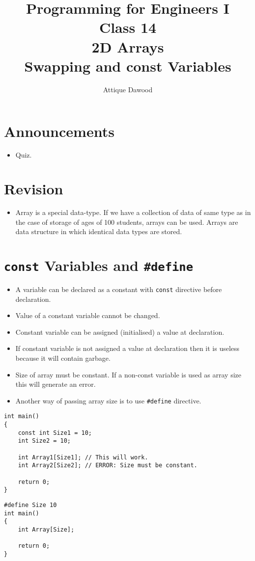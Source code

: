 \documentclass[12pt,a4paper]{article}
\title{\vspace{-2cm}Programming for Engineers I\\Class 14\\2D Arrays\\Swapping and const Variables}
\author{Attique Dawood}
\begin{document}
\maketitle
\section{Announcements}
\begin{itemize}
\item Quiz.
\end{itemize}
\section{Revision}
\begin{itemize}
\item Array is a special data-type. If we have a collection of data of same type as in the case of storage of ages of 100 students, arrays can be used. Arrays are data structure in which identical data types are stored.
\end{itemize}
\section{\texttt{const} Variables and \texttt{\#define}}
\begin{itemize}
\item A variable can be declared as a constant with \verb|const| directive before declaration.
\item Value of a constant variable cannot be changed.
\item Constant variable can be assigned (initialised) a value at declaration.
\item If constant variable is not assigned a value at declaration then it is useless because it will contain garbage.
\item Size of array must be constant. If a non-const variable is used as array size this will generate an error.
\item Another way of passing array size is to use \verb|#define| directive.
\end{itemize}
\begin{lstlisting}[caption={Using const as Array Size}]
int main()
{
	const int Size1 = 10;
	int Size2 = 10;
	
	int Array1[Size1]; // This will work.
	int Array2[Size2]; // ERROR: Size must be constant.

	return 0;
}
\end{lstlisting}
\begin{lstlisting}[caption={Using \#define to Declare Array Size}]
#define Size 10
int main()
{
	int Array[Size];

	return 0;
}
\end{lstlisting}
\end{document}
